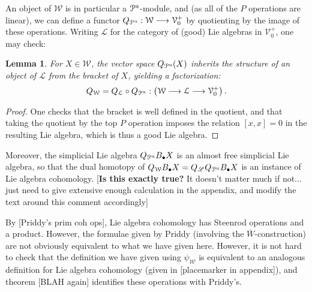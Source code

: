 \documentclass[11pt]{amsart}
\theoremstyle{plain}
\newtheorem{lem}[thm]{Lemma}
\theoremstyle{definition}
\renewcommand{\to}{\longrightarrow}
\newcommand{\scrL}{\mathscr{L}}
\newcommand{\calW}{\mathcal{W}}
\newcommand{\calP}{\mathcal{P}}
\newcommand{\calL}{\mathcal{L}}
\newcommand{\calV}{\mathcal{V}}
\theoremstyle{plain}
\newcommand{\PMonad}{{\calP^\textup{u}}}
\newcommand{\LambdaMonad}{\Lambda^\textup{u}}
\newcommand{\Palg}{{\calP}}
\newcommand{\LieOperad}{{\scrL}}
\newcommand{\vect}[2]{\calV^{#1}_{#2}}
\begin{document}
\begin{Cohomology operations for unstable Lie algebras over P}
An object of $\calW$ is in particular a $\PMonad$-module, and (as all of the $P$ operations are linear), we can define a functor $Q_{\PMonad}:\calW\to\vect{+}{0}$ by quotienting by the image of these operations. Writing $\calL$ for the category of (good) Lie algebras in $\vect{+}{0}$, one may check:
\begin{lem}
For $X\in\calW$, the vector space $Q_{\PMonad}(X)$ inherits the structure of an object of $\calL$ from the bracket of $X$, yielding a factorization:%
\[Q_{\calW}=Q_{\calL}\circ Q_{\PMonad}:\left(\calW\to \calL\to \vect{+}{0}\right).\]
\end{lem}
\begin{proof}
One checks that the bracket is well defined in the quotient, and that taking the quotient by the top $P$ operation imposes the relation $[x,x]=0$ in the resulting Lie algebra, which is thus a good Lie algebra.
\end{proof}
Moreover, the simplicial Lie algebra $Q_\PMonad B_\bullet X$ is an almost free simplicial Lie algebra, so that the dual homotopy of $Q_\calW B_\bullet X=Q_{\LieOperad} Q_\PMonad B_\bullet X$ is an instance of Lie algebra cohomology. [\textbf{Is this exactly true?} It doesn't matter much if not... just need to give extensive enough calculation in the appendix, and modify the text around this comment accordingly]

By [Priddy's prim coh ops], Lie algebra cohomology has Steenrod operations and a product. However, the formulae given by Priddy (involving the $\overline{W}$-construction) are not obviously equivalent to what we have given here. However, it is not hard to check that the definition we have given using $\psi_\calW$ is equivalent to an analogous definition for Lie algebra cohomology (given in [placemarker in appendix]), and theorem [BLAH again] identifies these operations with Priddy's.


\end{Cohomology operations for unstable Lie algebras over P}
\end{document}
